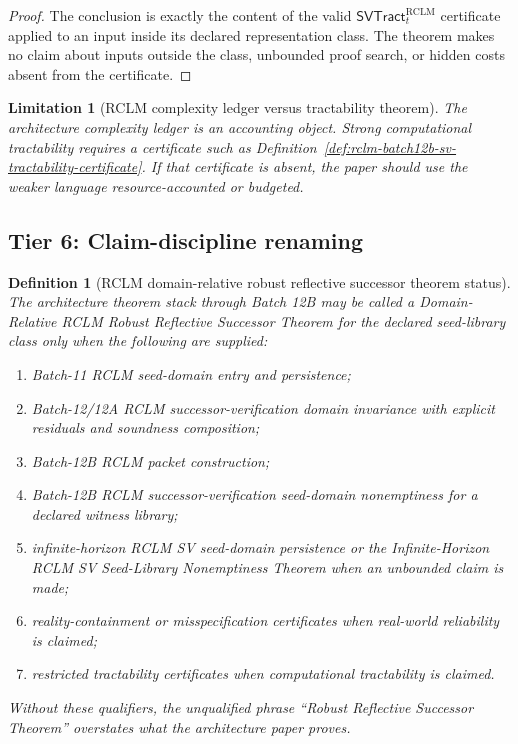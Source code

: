 \documentclass[11pt,a4paper]{article}
\newtheorem{definition}[theorem]{Definition}
\newtheorem{limitation}[theorem]{Limitation}
\newcommand{\RCLM}{\mathrm{RCLM}}
\begin{document}
\begin{proof}
The conclusion is exactly the content of the valid \(\mathsf{SVTract}_t^{\RCLM}\) certificate applied to an input inside its declared representation class. The theorem makes no claim about inputs outside the class, unbounded proof search, or hidden costs absent from the certificate.
\end{proof}

\begin{limitation}[RCLM complexity ledger versus tractability theorem]
\label{lim:rclm-batch12b-tractability-discipline}
The architecture complexity ledger is an accounting object. Strong computational tractability requires a certificate such as Definition~\ref{def:rclm-batch12b-sv-tractability-certificate}. If that certificate is absent, the paper should use the weaker language resource-accounted or budgeted.
\end{limitation}

\subsection{Tier 6: Claim-discipline renaming}

\begin{definition}[RCLM domain-relative robust reflective successor theorem status]
\label{def:rclm-batch12b-domain-relative-rrst-status}
The architecture theorem stack through Batch 12B may be called a \emph{Domain-Relative RCLM Robust Reflective Successor Theorem} for the declared seed-library class only when the following are supplied:
\begin{enumerate}[label=(\roman*),leftmargin=1.5em]
    \item Batch-11 RCLM seed-domain entry and persistence;
    \item Batch-12/12A RCLM successor-verification domain invariance with explicit residuals and soundness composition;
    \item Batch-12B RCLM packet construction;
    \item Batch-12B RCLM successor-verification seed-domain nonemptiness for a declared witness library;
    \item infinite-horizon RCLM SV seed-domain persistence or the Infinite-Horizon RCLM SV Seed-Library Nonemptiness Theorem when an unbounded claim is made;
    \item reality-containment or misspecification certificates when real-world reliability is claimed;
    \item restricted tractability certificates when computational tractability is claimed.
\end{enumerate}
Without these qualifiers, the unqualified phrase ``Robust Reflective Successor Theorem'' overstates what the architecture paper proves.
\end{definition}
\end{document}
